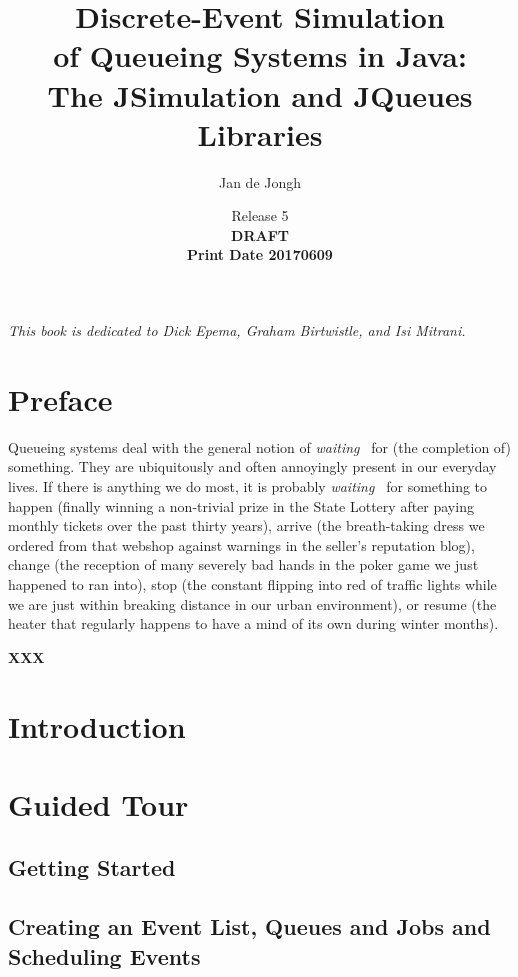 \documentclass[12pt]{book}
\title{Discrete-Event Simulation\\
       of Queueing Systems in Java:\\
       The JSimulation and JQueues Libraries}
\author{Jan de Jongh}
\date{Release 5\\{\bf DRAFT}\\{\bf Print Date 20170609}}
\begin{document}
\maketitle

\chapter*{}

{\em This book is dedicated to Dick Epema, Graham Birtwistle, and Isi Mitrani.}

\tableofcontents

\chapter{Preface}

Queueing systems deal with the general notion of {\em waiting\ }
  for (the completion of) something.
They are ubiquitously and often annoyingly present in our everyday lives.
If there is anything we do most,
  it is probably {\em waiting\ } for something to
  happen (finally winning a non-trivial prize in the State Lottery
          after paying monthly tickets over the past thirty years),
  arrive (the breath-taking dress we ordered from that webshop
          against warnings in the seller's reputation blog),
  change (the reception of many severely bad hands in the poker game
          we just happened to ran into),
  stop (the constant flipping into red of traffic lights
        while we are just within breaking distance
        in our urban environment),
  or resume (the heater that regularly happens to have
             a mind of its own during
             winter months).

{\bf XXX}

\chapter{Introduction}
\label{chap:intro}

\chapter{Guided Tour}
\label{chap:guided}

\section{Getting Started}
\label{sec:guided:getting-started}

\section{Creating an Event List, Queues and Jobs and Scheduling Events}
\label{sec:guided:eventlist-queues-jobs-events}
\end{document}
